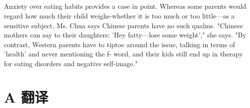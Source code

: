 \documentclass[]{article}
\begin{document}
\begin{spacing}{1.75}
{	\subsection{}
	Anxiety over eating habits provides a case in point. Whereas some parents would regard how much their child weighs-whether it is too much or too little—as a sensitive subject, Ms. Chua says Chinese parents have no such qualms. "Chinese mothers can say to their daughters: 'Hey fatty—lose some weight'," she says. "By contrast, Western parents have to tiptoe around the issue, talking in terms of 'health' and never mentioning the f- word, and their kids still end up in therapy for eating disorders and negative self-image."		
	
	}
\end{spacing}

\section{A 翻译}
\end{document}
